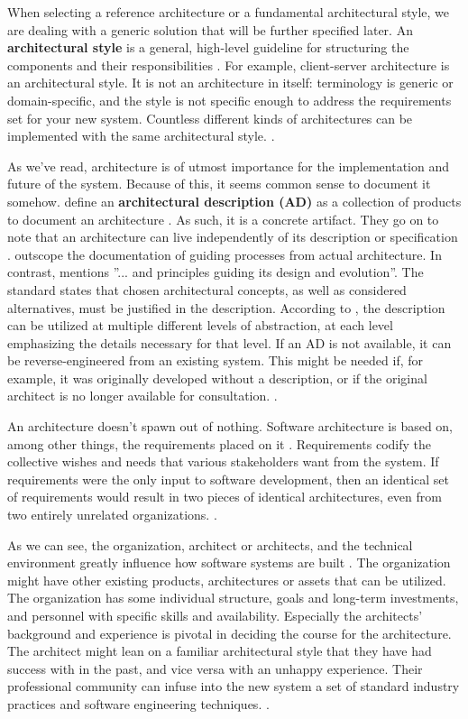 \documentclass[utf8,english]{gradu3}
\begin{document}
When selecting a reference architecture or a fundamental
architectural style, we are dealing with a generic solution that will be further
specified later. An \textbf{architectural style} is a general, high-level guideline for
structuring the components and their responsibilities \parencite[24]{Bass1998}. For
example, client-server architecture is an architectural style. It is not an
architecture in itself: terminology is generic or domain-specific, and the style
is not specific enough to address the requirements set for your new system.
Countless different kinds of architectures can be implemented with the same
architectural style. \parencite[24]{Bass1998}.

As we've read, architecture is of utmost importance for the implementation and
future of the system. Because of this, it seems common sense to document
it somehow. \textcite[24]{Bass1998} define an \textbf{architectural description (AD)} as a
collection of products to document an architecture \parencite[3]{IEEE42010}. As such, it
is a concrete artifact. They go on to note that an architecture can live
independently of its description or specification \parencite[24]{Bass1998}. \textcite[27]{Bass1998}
outscope the documentation of guiding processes from actual architecture.  In
contrast, \textcite[3]{IEEE42010} mentions ''... and principles guiding its design and
evolution''. The standard states that chosen architectural concepts, as well as
considered alternatives, must be justified in the description. According to
\textcite[67]{IEEE12207}, the description can be utilized at multiple different levels of
abstraction, at each level emphasizing the details necessary for that level. If
an AD is not available, it can be reverse-engineered from an existing system.
This might be needed if, for example, it was originally developed without a
description, or if the original architect is no longer available for
consultation. \parencite[7]{IEEE42010}.

An architecture doesn't spawn out of nothing. Software architecture is based on,
among other things, the requirements placed on it \parencite{Bass1998}. Requirements
codify the collective wishes and needs that various stakeholders want from the
system. If requirements were the only input to software development, then an
identical set of requirements would result in two pieces of identical
architectures, even from two entirely unrelated organizations. \parencite[5-9]{Bass1998}.

As we can see, the organization, architect or architects, and the technical
environment greatly influence how software systems are built \parencite{Bass1998}. The
organization might have other existing products, architectures or assets that
can be utilized. The organization has some individual structure, goals and
long-term investments, and personnel with specific skills and availability.
Especially the architects' background and experience is pivotal in deciding the
course for the architecture. The architect might lean on a familiar
architectural style that they have had success with in the past, and vice versa
with an unhappy experience. Their professional community can infuse into the new
system a set of standard industry practices and software engineering techniques.
\parencite[5-9]{Bass1998}.
\end{document}
